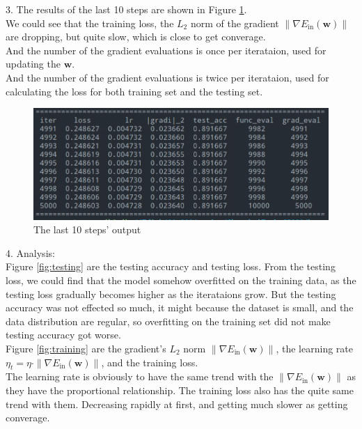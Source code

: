 3. The results of the last 10 steps are shown in Figure \ref{fig:info}.\\
We could see that the training loss, the $L_2$ norm of the gradient $\|\nabla E_{\text{in}}(\mathbf{w})\|$ are dropping, but quite slow, which is close to get converage.\\
And the number of the gradient evaluations is once per iterataion, used for updating the $\mathbf{w}$.\\
And the number of the gradient evaluations is twice per iterataion, used for calculating the loss for both training set and the testing set.\\

\begin{figure}[htbp]
  \centerline{\includegraphics[width=\textwidth]{../image/info.png}}
  \caption{The last 10 steps' output} 
  \label{fig:info} 
\end{figure}

4. Analysis:\\
Figure \ref{fig:testing} are the testing accuracy and testing loss. From the 
testing loss, we could find that the model somehow overfitted on the training data, as the 
testing loss gradually becomes higher as the iterataions grow. But the testing accuracy was not effected so much,
it might because the dataset is small, and the data distribution are regular, so overfitting on the training set did not make testing accuracy got worse.\\

Figure \ref{fig:training} are the gradient's $L_2$ norm $\|\nabla E_{\text{in}}(\mathbf{w})\|$, the learning rate $\eta_t = \eta\cdot \|\nabla E_{\text{in}}(\mathbf{w})\|$, and the training loss.\\
The learning rate is obviously to have the same trend with the $\|\nabla E_{\text{in}}(\mathbf{w})\|$ as they have the proportional relationship. The training loss also has the 
quite same trend with them. Decreasing rapidly at first, and getting much slower as getting converage.\\

